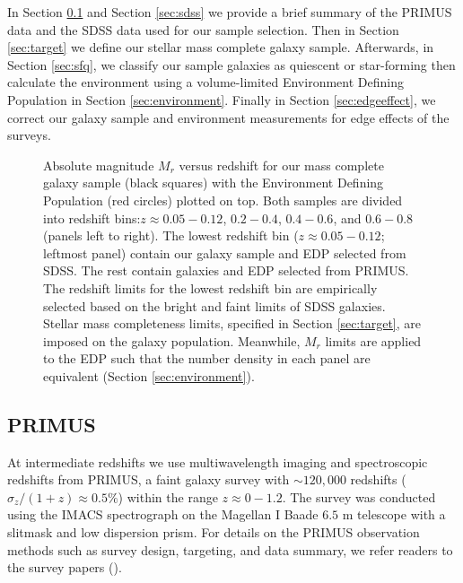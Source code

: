 \documentclass{emulateapj}
\begin{document}
In Section \ref{sec:primus} and Section \ref{sec:sdss} we provide a brief summary of the PRIMUS data and the SDSS data used for our sample selection. Then in Section \ref{sec:target} we define our stellar mass complete galaxy sample. Afterwards, in Section \ref{sec:sfq}, we classify our sample galaxies as quiescent or star-forming then calculate the environment using a volume-limited Environment Defining Population in Section \ref{sec:environment}. 
Finally in Section \ref{sec:edgeeffect}, we correct our galaxy sample and environment measurements for edge effects of the surveys. 

\begin{figure*}
    \begin{center}
        \leavevmode
        \caption{Absolute magnitude $M_{r}$ versus redshift for our mass complete galaxy sample (black squares) with the Environment Defining Population (red circles) plotted on top. Both samples are divided into redshift bins:$z \approx 0.05-0.12$, $0.2-0.4$, $0.4-0.6$, and $0.6-0.8$ (panels left to right). The lowest redshift bin ($z \approx 0.05-0.12$; leftmost panel) contain our galaxy sample and EDP selected from SDSS. The rest contain galaxies and EDP selected from PRIMUS. The redshift limits for the lowest redshift bin are empirically selected based on the bright and faint limits of SDSS galaxies. Stellar mass completeness limits, specified in Section \ref{sec:target}, are imposed on the galaxy population. Meanwhile, $M_{r}$ limits are applied to the EDP such that the number density in each panel are equivalent (Section \ref{sec:environment}).} \label{fig:targetEDP}
    \end{center}
\end{figure*}
\subsection{PRIMUS} \label{sec:primus}
At intermediate redshifts we use multiwavelength imaging and spectroscopic redshifts from PRIMUS, a faint galaxy survey with $\sim 120,000$ redshifts ($\sigma_z/(1+z) \approx 0.5 \%$) within the range $z \approx 0-1.2$. The survey was conducted using the IMACS spectrograph on the Magellan I Baade $6.5$ m telescope with a slitmask and low dispersion prism. For details on the PRIMUS observation methods such as survey design, targeting, and data summary, we refer readers to the survey papers (\citealt{Coil:2011aa, Cool:2013aa}). 
\end{document}
